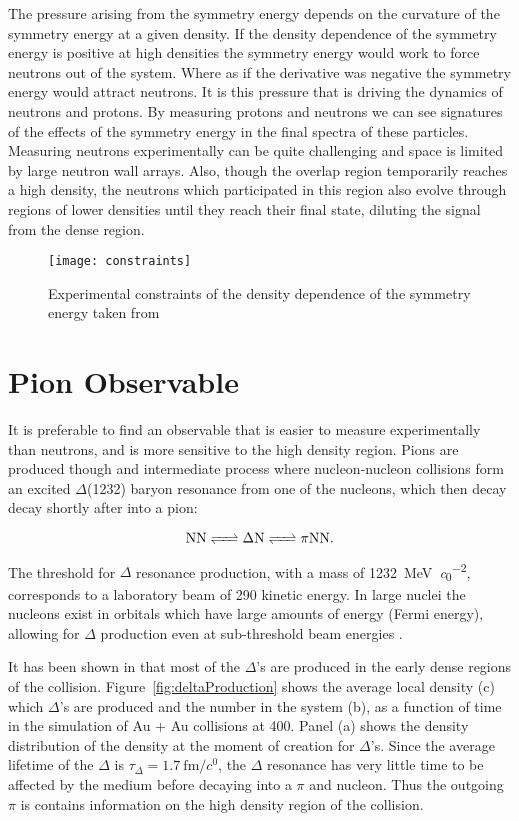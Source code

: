 The pressure arising from the symmetry energy depends on the curvature of the symmetry energy at a given density. If the density dependence of the symmetry energy is positive at high densities the symmetry energy would work to force neutrons out of the system. Where as if the derivative was negative the symmetry energy would attract neutrons. It is this pressure that is driving the dynamics of neutrons and protons. By measuring protons and neutrons we can see signatures of the effects of the symmetry energy in the final spectra of these particles. Measuring neutrons experimentally can be quite challenging and space is limited by large neutron wall arrays. Also, though the overlap region temporarily reaches a high density, the neutrons which participated in this region also evolve through regions of lower densities until they reach their final state, diluting the signal from the dense region. 


\begin{figure}[!htb]
\centering
\texttt{[image: constraints]}
\caption{Experimental constraints of the density dependence of the symmetry energy taken from \cite{awayforward}}
\label{fig:symDen}
\end{figure}


\section{Pion Observable}
It is preferable to find an observable that is easier to measure experimentally than neutrons, and is more sensitive to the high density region. Pions are produced though and intermediate process where nucleon-nucleon collisions form an excited $\Delta$(1232) baryon resonance from one of the nucleons, which then decay decay shortly after into a pion:

\begin{equation}
\ce{ NN <=> \Delta N <=> \pi NN}.
\end{equation}

The threshold for $\Delta$ resonance production, with a mass of \SI{1232}{\mega\electronvolt\per\clight\squared}, corresponds to a laboratory beam of \SI{290}{\MeVA} kinetic energy. In large nuclei the nucleons exist in orbitals which have large amounts of energy (Fermi energy), allowing for $\Delta$ production even at sub-threshold beam energies \cite{fermiEnergy}.


It has been shown in \cite{mingzhang} that most of the $\Delta$'s are produced in the early dense regions of the collision. Figure~\ref{fig:deltaProduction} shows the average local density (c) which $\Delta$'s are produced and the number in the system (b), as a function of time in the simulation of Au + Au collisions at \SI{400}{\MeVA}. Panel (a) shows the density distribution of the density at the moment of creation for $\Delta$'s. Since the average lifetime of the $\Delta$  is $\tau_{\Delta} = \SI{1.7}{\femto\metre\per\clight}$, the $\Delta$ resonance has very little time to be affected by the medium before decaying into a $\pi$ and nucleon. Thus the outgoing $\pi$ is contains information on the high density region of the collision. 


